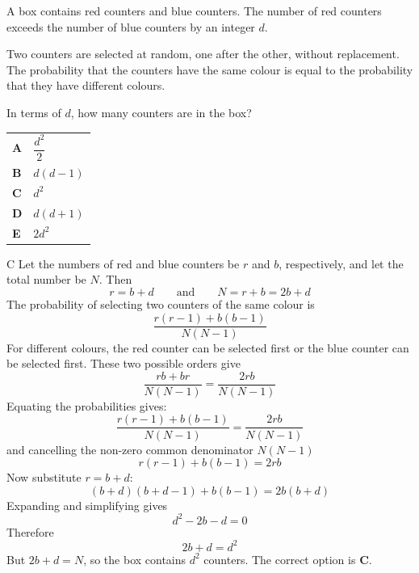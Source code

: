 \documentclass[11pt,a4paper]{article}
\begin{document}
\begin{enumerate}[label=\textbf{\arabic*.},leftmargin=*,itemsep=0pt,start=15]
A box contains red counters and blue counters. The number of red counters exceeds the number of blue counters by an integer $d$.

Two counters are selected at random, one after the other, without replacement. The probability that the counters have the same colour is equal to the probability that they have different colours.

In terms of $d$, how many counters are in the box?

\par\vspace*{12pt}
\begin{tabularx}{\linewidth}{@{}>{\bfseries}l Y@{}}
A &
$\dfrac{d^2}{2}$
\\[0.8em]
B &
$d(d-1)$
\\[0.8em]
C &
$d^2$
\\[0.8em]
D &
$d(d+1)$
\\[0.8em]
E &
$2d^2$
\\
\end{tabularx}

\begin{djsSolution}{C}
Let the numbers of red and blue counters be $r$ and $b$, respectively, and let the total number be $N$. Then
\[
r=b+d \qquad\text{and}\qquad N=r+b=2b+d
\]
The probability of selecting two counters of the same colour is
\[
\frac{r(r-1)+b(b-1)}{N(N-1)}
\]
For different colours, the red counter can be selected first or the blue counter can be selected first. These two possible orders give
\[
\frac{rb+br}{N(N-1)}=\frac{2rb}{N(N-1)}
\]
Equating the probabilities gives:
\[
\frac{r(r-1)+b(b-1)}{N(N-1)}=\frac{2rb}{N(N-1)}
\]
and cancelling the non-zero common denominator $N(N-1)$ 
\[
r(r-1)+b(b-1)=2rb
\]
Now substitute $r=b+d$:
\[
(b+d)(b+d-1)+b(b-1)=2b(b+d)
\]
Expanding and simplifying gives
\[
d^2-2b-d=0
\]
Therefore
\[
2b+d=d^2
\]
But $2b+d=N$, so the box contains $d^2$ counters. The correct option is \textbf{C}.
\end{djsSolution}
\end{enumerate}
\clearpage
\thispagestyle{djssolutions}
\end{document}
